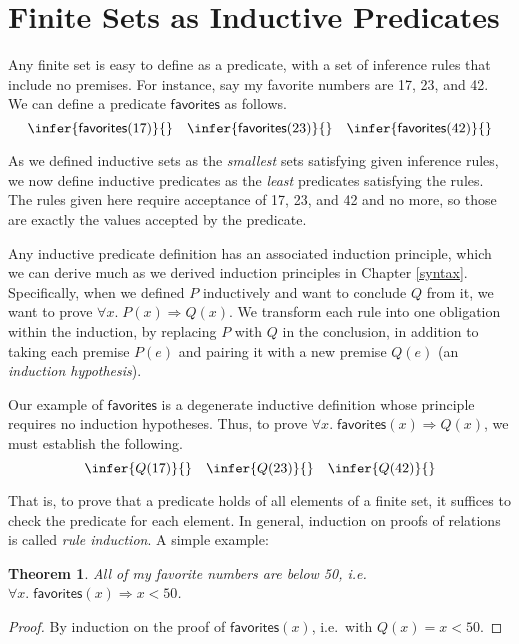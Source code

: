 \documentclass{amsbook}
\newtheorem{theorem}{Theorem}[chapter]
\theoremstyle{definition}
\theoremstyle{remark}
\numberwithin{section}{chapter}
\numberwithin{equation}{chapter}
\begin{document}
\section{Finite Sets as Inductive Predicates}

\newcommand{\favs}[1]{\mathsf{favorites}(#1)}

Any finite set is easy to define as a predicate, with a set of inference rules that include no premises.
For instance, say my favorite numbers are 17, 23, and 42.
We can define a predicate $\mathsf{favorites}$ as follows.
$$\infer{\favs{17}}{}
\quad \infer{\favs{23}}{}
\quad \infer{\favs{42}}{}$$

As we defined inductive sets as the \emph{smallest} sets satisfying given inference rules, we now define inductive predicates as the \emph{least} predicates satisfying the rules.
The rules given here require acceptance of 17, 23, and 42 and no more, so those are exactly the values accepted by the predicate.

Any inductive predicate definition has an associated induction principle, which we can derive much as we derived induction principles in Chapter \ref{syntax}.
Specifically, when we defined $P$ inductively and want to conclude $Q$ from it, we want to prove $\forall x. \; P(x) \Rightarrow Q(x)$.
We transform each rule into one obligation within the induction, by replacing $P$ with $Q$ in the conclusion, in addition to taking each premise $P(e)$ and pairing it with a new premise $Q(e)$ (an \emph{induction hypothesis}).

Our example of $\mathsf{favorites}$ is a degenerate inductive definition whose principle requires no induction hypotheses.  Thus, to prove $\forall x. \; \favs{x} \Rightarrow Q(x)$, we must establish the following.
$$\infer{Q(17)}{}
\quad \infer{Q(23)}{}
\quad \infer{Q(42)}{}$$

That is, to prove that a predicate holds of all elements of a finite set, it suffices to check the predicate for each element.
In general, induction on proofs of relations is called \emph{rule induction}.
A simple example:

\begin{theorem}
  All of my favorite numbers are below 50, i.e.\ $\forall x. \; \favs{x} \Rightarrow x < 50$.
\end{theorem}
\begin{proof}
  By induction on the proof of $\favs{x}$, i.e.\ with $Q(x) = x < 50$.
\end{proof}
\end{document}
